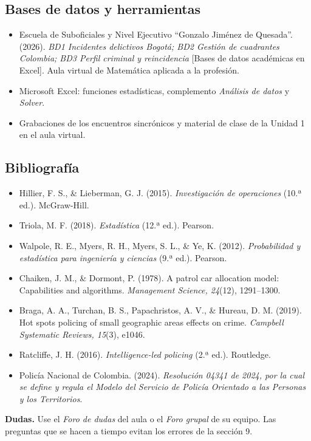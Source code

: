 \subsection{Bases de datos y herramientas}
\begin{itemize}[leftmargin=1.4em,itemsep=1pt]
\item Escuela de Suboficiales y Nivel Ejecutivo ``Gonzalo Jiménez de Quesada''. (2026). \textit{BD1 Incidentes delictivos Bogotá; BD2 Gestión de cuadrantes Colombia; BD3 Perfil criminal y reincidencia} [Bases de datos académicas en Excel]. Aula virtual de Matemática aplicada a la profesión.
\item Microsoft Excel: funciones estadísticas, complemento \textit{Análisis de datos} y \textit{Solver}.
\item Grabaciones de los encuentros sincrónicos y material de clase de la Unidad 1 en el aula virtual.
\end{itemize}

\subsection{Bibliografía}
\begin{itemize}[leftmargin=1.4em,itemsep=1pt]
\item Hillier, F. S., \& Lieberman, G. J. (2015). \textit{Investigación de operaciones} (10.ª ed.). McGraw-Hill.
\item Triola, M. F. (2018). \textit{Estadística} (12.ª ed.). Pearson.
\item Walpole, R. E., Myers, R. H., Myers, S. L., \& Ye, K. (2012). \textit{Probabilidad y estadística para ingeniería y ciencias} (9.ª ed.). Pearson.
\item Chaiken, J. M., \& Dormont, P. (1978). A patrol car allocation model: Capabilities and algorithms. \textit{Management Science, 24}(12), 1291--1300.
\item Braga, A. A., Turchan, B. S., Papachristos, A. V., \& Hureau, D. M. (2019). Hot spots policing of small geographic areas effects on crime. \textit{Campbell Systematic Reviews, 15}(3), e1046.
\item Ratcliffe, J. H. (2016). \textit{Intelligence-led policing} (2.ª ed.). Routledge.
\item Policía Nacional de Colombia. (2024). \textit{Resolución 04341 de 2024, por la cual se define y regula el Modelo del Servicio de Policía Orientado a las Personas y los Territorios}.
\end{itemize}

\vspace{0.5cm}
\begin{cajaExito}
\textbf{Dudas.} Use el \textit{Foro de dudas} del aula o el \textit{Foro grupal} de su
equipo. Las preguntas que se hacen a tiempo evitan los errores de la sección 9.
\end{cajaExito}



